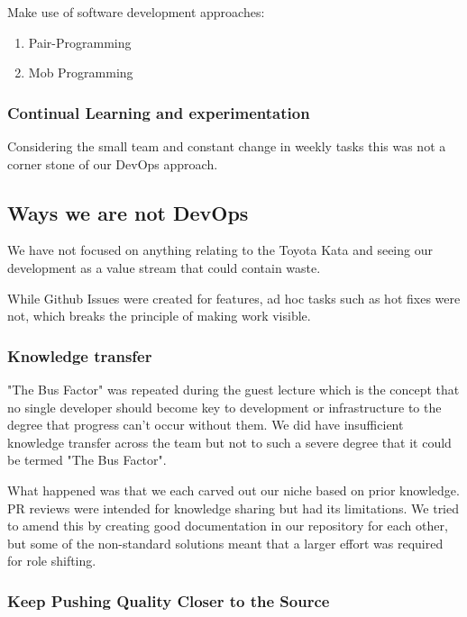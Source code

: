 \documentclass{article}
\begin{document}
Make use of software development approaches:

\begin{enumerate}
    \item Pair-Programming
    \item Mob Programming
\end{enumerate}

\subsubsection{Continual Learning and experimentation}

Considering the small team and constant change in weekly tasks this was not a corner stone of our DevOps approach. 

\subsection{Ways we are not DevOps}

We have not focused on anything relating to the Toyota Kata and seeing our development as a value stream that could contain waste. 

While Github Issues were created for features, ad hoc tasks such as hot fixes were not, which breaks the principle of making work visible. 

\subsubsection{Knowledge transfer}

"The Bus Factor" was repeated during the guest lecture which is the concept that no single developer should become key to development or infrastructure to the degree that progress can't occur without them. We did have insufficient knowledge transfer across the team but not to such a severe degree that it could be termed "The Bus Factor".

What happened was that we each carved out our niche based on prior knowledge. PR reviews were intended for knowledge sharing but had its limitations. We tried to amend this by creating good documentation in our repository for each other, but some of the non-standard solutions meant that a larger effort was required for role shifting.  

\subsubsection{Keep Pushing Quality Closer to the Source}
\end{document}
